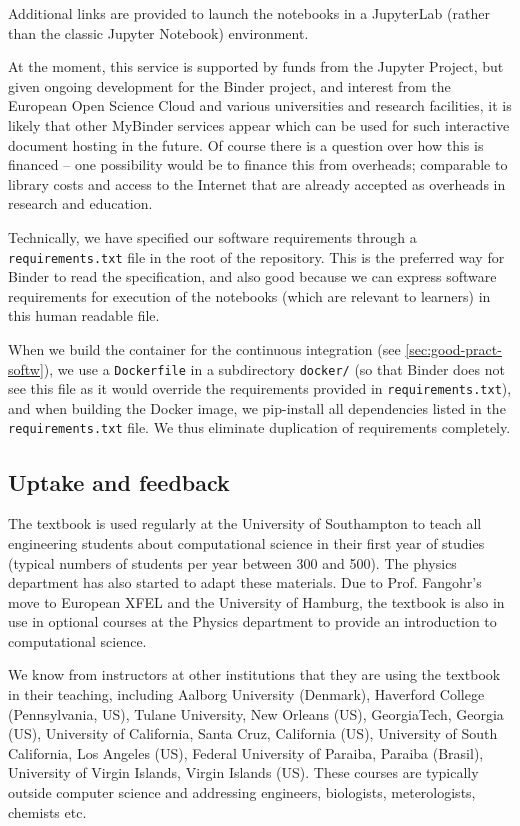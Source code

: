 \documentclass{deliverablereport}
\begin{document}
Additional links are provided to launch the notebooks in a JupyterLab
(rather than the classic Jupyter Notebook) environment.

At the moment, this service is supported by funds from the Jupyter
Project, but given ongoing development for the Binder project, and
interest from the European Open Science Cloud and various universities
and research facilities, it is likely that other MyBinder services
appear which can be used for such interactive document hosting in the
future. Of course there is a question over how this is financed -- one
possibility would be to finance this from overheads; comparable to
library costs and access to the Internet that are already accepted as
overheads in research and education.

Technically, we have specified our software requirements through a
\texttt{requirements.txt} file in the root of the repository. This is
the preferred way for Binder to read the specification, and also good
because we can express software requirements for execution of the
notebooks (which are relevant to learners) in this human readable
file.

When we build the container for the continuous integration (see
\ref{sec:good-pract-softw}), we use a \texttt{Dockerfile} in a subdirectory
\texttt{docker/} (so that Binder does not see this file as it would
override the requirements provided in \texttt{requirements.txt}), and
when building the Docker image, we pip-install all dependencies listed
in the \texttt{requirements.txt} file. We thus eliminate duplication
of requirements completely.

\subsection{Uptake and feedback}

The textbook is used regularly at the University of Southampton to
teach all engineering students about computational science in their
first year of studies (typical numbers of students per year between
300 and 500). The physics department has also started to adapt these
materials. Due to Prof. Fangohr's move to European XFEL and the
University of Hamburg, the textbook is also in use in optional
courses at the Physics department to provide an introduction to
computational science.

We know from instructors at other institutions that they are using the
textbook in their teaching, including Aalborg University (Denmark),
Haverford College (Pennsylvania, US), Tulane University, New Orleans
(US), GeorgiaTech, Georgia (US), University of California, Santa Cruz,
California (US), University of South California, Los Angeles
(US), Federal University of Paraiba, Paraiba (Brasil), University of
Virgin Islands, Virgin Islands (US). These courses are typically
outside computer science and addressing engineers, biologists,
meterologists, chemists etc.
\end{document}
